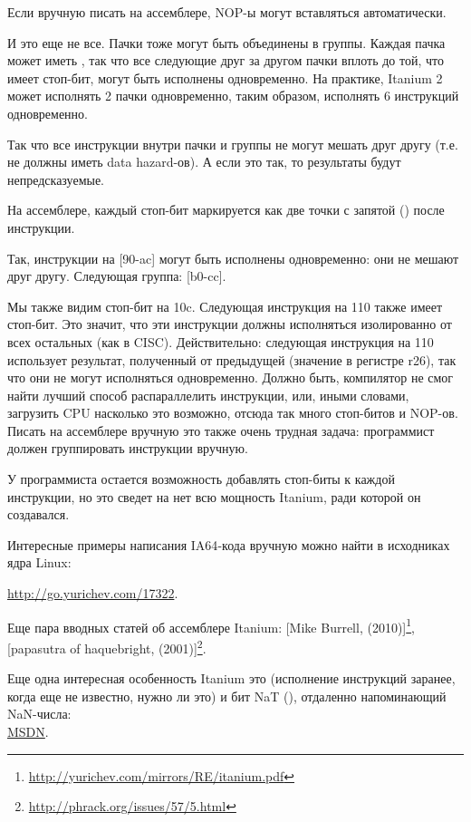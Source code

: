 Если вручную писать на ассемблере, \ac{NOP}-ы могут вставляться автоматически.

И это еще не все. Пачки тоже могут быть объединены в группы.
Каждая пачка может иметь , так что все следующие друг за другом пачки вплоть до той,
что имеет стоп-бит, могут быть исполнены одновременно.
На практике, Itanium 2 может исполнять 2 пачки одновременно, таким образом, исполнять
6 инструкций одновременно.

Так что все инструкции внутри пачки и группы не могут мешать друг другу (т.е. не должны
иметь data hazard-ов).
А если это так, то результаты будут непредсказуемые.

На ассемблере, каждый стоп-бит маркируется как две точки с запятой (\TT{;;}) после инструкции.

Так, инструкции на [90-ac] могут быть исполнены одновременно: они не мешают друг другу. Следующая группа: [b0-cc].

Мы также видим стоп-бит на 10c.
Следующая инструкция на 110 также имеет стоп-бит.
Это значит, что эти инструкции должны исполняться изолированно от всех остальных (как в \ac{CISC}).
Действительно: следующая инструкция на 110 использует результат, полученный от предыдущей (значение
в регистре r26), так что они не могут исполняться одновременно.
Должно быть, компилятор не смог найти лучший способ распараллелить инструкции, или, иными
словами, загрузить \ac{CPU} насколько это возможно, отсюда так много стоп-битов и \ac{NOP}-ов.
Писать на ассемблере вручную это также очень трудная задача: программист должен группировать
инструкции вручную.

У программиста остается возможность добавлять стоп-биты к каждой инструкции, но это
сведет на нет всю мощность Itanium, ради которой он создавался.

Интересные примеры написания \ac{IA64}-кода вручную можно найти в исходниках ядра Linux:

\url{http://go.yurichev.com/17322}.

Еще пара вводных статей об ассемблере Itanium:
[Mike Burrell,  (2010)]\footnote{\AlsoAvailableAs \url{http://yurichev.com/mirrors/RE/itanium.pdf}},
[papasutra of haquebright,  (2001)]\footnote{\AlsoAvailableAs \url{http://phrack.org/issues/57/5.html}}.

Еще одна интересная особенность Itanium это  (исполнение инструкций
заранее, когда еще не известно, нужно ли это) и бит NaT (), отдаленно напоминающий
\gls{NaN}-числа: \\
\href{http://go.yurichev.com/17323}{MSDN}.


